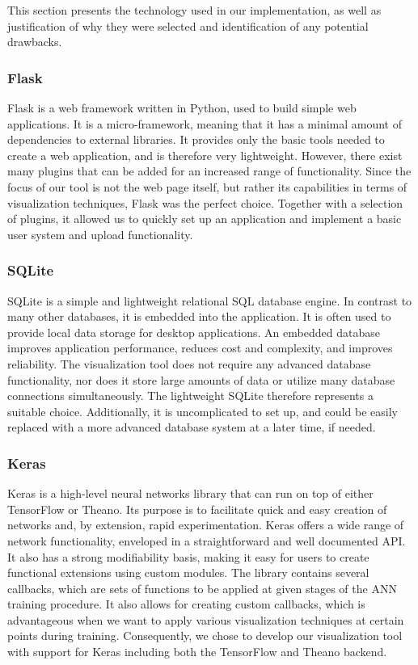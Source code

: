 This section presents the technology used in our implementation, as well as justification of why they were selected and identification of any potential drawbacks.

\subsubsection{Flask}

Flask is a web framework written in Python, used to build simple web applications. It is a micro-framework, meaning that it has a minimal amount of dependencies to external libraries. It provides only the basic tools needed to create a web application, and is therefore very lightweight. However, there exist many plugins that can be added for an increased range of functionality. Since the focus of our tool is not the web page itself, but rather its capabilities in terms of visualization techniques, Flask was the perfect choice. Together with a selection of plugins, it allowed us to quickly set up an application and implement a basic user system and upload functionality.

\subsubsection{SQLite}

SQLite is a simple and lightweight relational SQL database engine. In contrast to many other databases, it is embedded into the application. It is often used to provide local data storage for desktop applications. An embedded database improves application performance, reduces cost and complexity, and improves reliability. The visualization tool does not require any advanced database functionality, nor does it store large amounts of data or utilize many database connections simultaneously. The lightweight SQLite therefore represents a suitable choice. Additionally, it is uncomplicated to set up, and could be easily replaced with a more advanced database system at a later time, if needed.

\subsubsection{Keras}

Keras is a high-level neural networks library that can run on top of either TensorFlow or Theano. Its purpose is to facilitate quick and easy creation of networks and, by extension, rapid experimentation. Keras offers a wide range of network functionality, enveloped in a straightforward and well documented API. It also has a strong modifiability basis, making it easy for users to create functional extensions using custom modules. The library contains several callbacks, which are sets of functions to be applied at given stages of the ANN training procedure. It also allows for creating custom callbacks, which is advantageous when we want to apply various visualization techniques at certain points during training. Consequently, we chose to develop our visualization tool with support for Keras including both the TensorFlow and Theano backend.  

